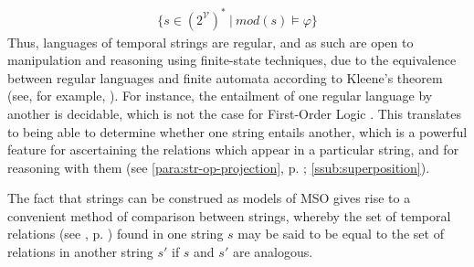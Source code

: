 \documentclass[a4paper,12pt,leqno]{article}
\newcommand{\V}{\mathcal{V}}
\renewcommand{\phi}{\varphi}
\newcommand{\nb}[1]{{\color{red}[NB\footnote{{\color{red}#1}}]}}
\begin{document}
\begin{align}\label{def:mso-regularity}
	\{s \in (2^{\V})^* ~|~ mod(s) \models \phi \}
\end{align}
Thus, languages of temporal strings are regular, and as such are open to manipulation and reasoning using finite-state techniques, due to the equivalence between regular languages and finite automata according to Kleene's theorem (see, for example, \citet[p. 41]{yu1997regular}). For instance, the entailment of one regular language by another is decidable, which is not the case for First-Order Logic \citep{trakhtenbrot1953recursive,elgot1966decidability}. This translates to being able to determine whether one string entails another, which is a powerful feature for ascertaining the relations which appear in a particular string, and for reasoning with them (see \cref{para:str-op-projection}, p. \pageref{para:str-op-projection}; \cref{ssub:superposition}).

The fact that strings can be construed as models of MSO gives rise to a convenient method of comparison between strings, whereby the set of temporal relations (see , p. \pageref{tab:allen-rels-strings}) found in one string $s$ may be said to be equal to the set of relations in another string $s'$ if $s$ and $s'$ are analogous.
\end{document}
